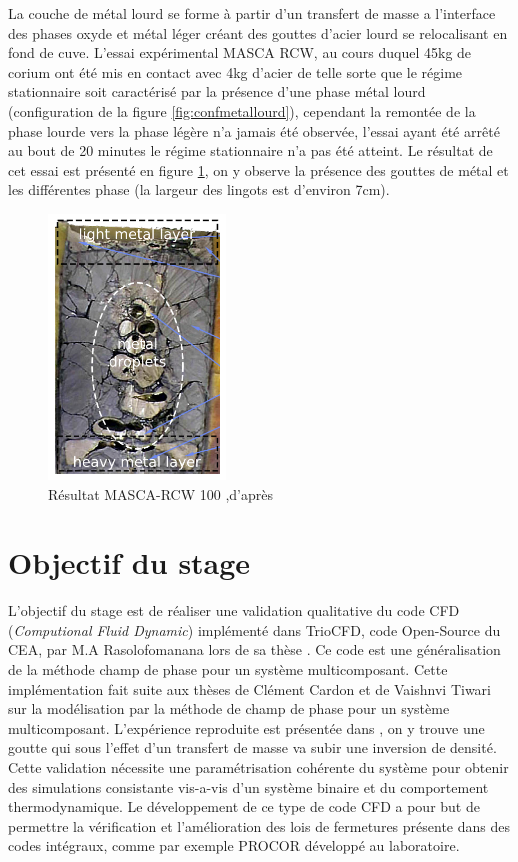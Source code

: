 La couche de métal lourd se forme à partir d'un transfert de masse a l'interface des phases oxyde et métal léger créant des gouttes d'acier lourd se relocalisant en fond de cuve. L'essai expérimental MASCA RCW, au cours duquel 45kg de corium ont été mis en contact avec 4kg d'acier de telle sorte que le régime stationnaire soit caractérisé par la présence d'une phase métal lourd (configuration de la figure \ref{fig:confmetallourd}), cependant la remontée de la phase lourde vers la phase légère n'a jamais été observée, l'essai ayant été arrêté au bout de 20 minutes le régime stationnaire n'a pas été atteint. Le résultat de cet essai est présenté en figure \ref{fig:masca}, on y observe la présence des gouttes de métal et les différentes phase (la largeur des lingots est d'environ 7cm).
 \begin{figure}[H]
	\centering
	\includegraphics[width=0.3\linewidth]{figure/MASCA_RCW.png}
	\caption[Résultat MASCA-RCW 100]{Résultat MASCA-RCW 100 ,d'après \cite{tellier_interfaces_2019}}
	\label{fig:masca}
\end{figure}


\section{Objectif du stage}
L'objectif du stage est de réaliser une validation qualitative du code CFD (\textit{Computional Fluid Dynamic}) implémenté dans TrioCFD, code Open-Source du CEA, par M.A Rasolofomanana lors de sa thèse \cite{rasolofomanana_modelisation_nodate}. Ce code est une généralisation de la méthode champ de phase pour un système multicomposant. Cette implémentation fait suite aux thèses de Clément Cardon \cite{cardon_modelisation_2016} et de Vaishnvi Tiwari \cite{tiwari_consistent_2019} sur la modélisation par la méthode de champ de phase pour un système multicomposant. L'expérience reproduite est présentée dans \cite{rao_influence_2015}, on y trouve une goutte qui sous l'effet d'un transfert de masse va subir une inversion de densité. Cette validation nécessite une paramétrisation cohérente du système pour obtenir des simulations consistante vis-a-vis d'un système binaire et du comportement thermodynamique. Le développement de ce type de code CFD a pour but de permettre la vérification et l'amélioration des lois de fermetures présente dans des codes intégraux, comme par exemple PROCOR développé au laboratoire.